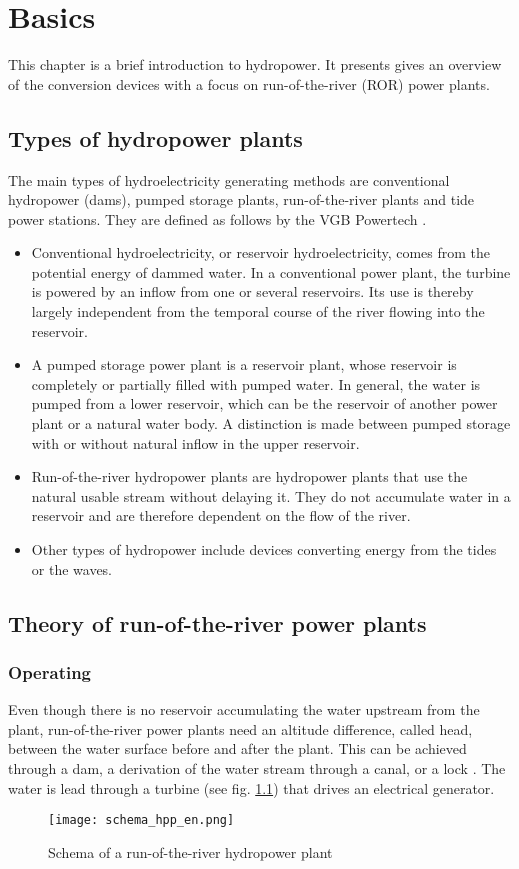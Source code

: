 \chapter{Basics}
\label{chap:basics}

This chapter is a brief introduction to hydropower. It presents gives an overview of the conversion devices with a focus on run-of-the-river (ROR) power plants.

\section{Types of hydropower plants}

The main types of hydroelectricity generating methods are conventional hydropower (dams), pumped storage plants, run-of-the-river plants and tide power stations. They are defined as follows by the VGB Powertech \cite{vgb}.

\begin{itemize}
 \item Conventional hydroelectricity, or reservoir hydroelectricity, comes from the potential energy of dammed water. In a conventional power plant, the turbine is powered by an inflow from one or several reservoirs. Its use is thereby largely independent from the temporal course of the river flowing into the reservoir.
 \item A pumped storage power plant is a reservoir plant, whose reservoir is completely or partially filled with pumped water. In general, the water is pumped from a lower reservoir, which can be the reservoir of another power plant or a natural water body. A distinction is made between pumped storage with or without natural inflow in the upper reservoir.
 \item Run-of-the-river hydropower plants are hydropower plants that use the natural usable stream without delaying it. They do not accumulate water in a reservoir and are therefore dependent on the flow of the river.
 \item Other types of hydropower include devices converting energy from the tides or the waves.
\end{itemize}


\section{Theory of run-of-the-river power plants}
\subsection{Operating}
Even though there is no reservoir accumulating the water upstream from the plant, run-of-the-river power plants need an altitude difference, called head, between the water surface before and after the plant. This can be achieved through a dam, a derivation of the water stream through a canal, or a lock \cite{tdi_petites_centrales}. The water is lead through a turbine (see fig. \ref{schema_hpp}) that drives an electrical generator.
\begin{figure}[H]
\centering
\texttt{[image: schema\_hpp\_en.png]}
\caption[Schema of a run-of-the-river hydropower plant]{Schema of a run-of-the-river hydropower plant \cite{quaschning}}
\label{schema_hpp}
\end{figure}
